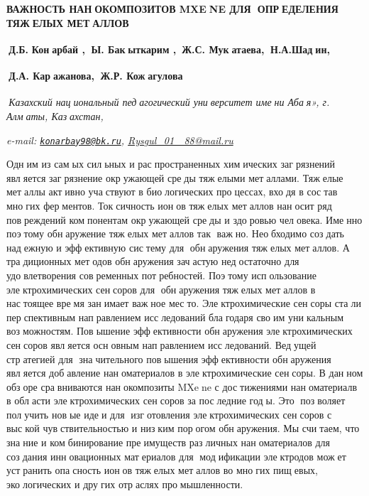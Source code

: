 {{\bfseries ВАЖНОСТЬ НАНОКОМПОЗИТОВ MXENE ДЛЯ ОПРЕДЕЛЕНИЯ ТЯЖЕЛЫХ
МЕТАЛЛОВ}

{\bfseries \textsuperscript{}Д.Б.}
{\bfseries Кон}{\bfseries арбай\textsuperscript{\envelope } , \textsuperscript{}Ы.
Бакыткарим\textsuperscript{\envelope } ,} \textsuperscript{}{\bfseries Ж.С.
Мукатаева, \textsuperscript{}Н.А.Шадин,}

{\bfseries \textsuperscript{}Д.А. Каражанова, \textsuperscript{}Ж.Р.
Кожагулова}

\emph{\textsuperscript{}Казахский национальный педагогический
университет имени Абая», г. Алматы, Казахстан,}

\emph{e-mail:
\href{mailto:konarbay98@bk.ru}{\nolinkurl{konarbay98@bk.ru}},
\href{mailto:Rysgul_01_88@mail.ru}{Rysgul\_01\_88@mail.ru}}

Одним из самых сильных и распространенных химических загрязнений
является загрязнение окружающей среды тяжелыми металлами. Тяжелые
металлы активно участвуют в биологических процессах, входя в
состав многих ферментов. Токсичность ионов тяжелых металлов
наносит ряд повреждений компонентам окружающей среды и здоровью
человека. Именно поэтому обнаружение тяжелых металлов так важно.
Необходимо создать надежную и эффективную систему для обнаружения
тяжелых металлов. А традиционных методов обнаружения зачастую
недостаточно для удовлетворения современных потребностей. Поэтому
использование электрохимических сенсоров для обнаружения тяжелых
металлов в настоящее время занимает важное место.
Электрохимические сенсоры стали перспективным направлением
исследований благодаря своим уникальным возможностям. Повышение
эффективности обнаружения электрохимических сенсоров является
основным направлением исследований. Ведущей стратегией для
значительного повышения эффективности обнаружения является
добавление наноматериалов в электрохимические сенсоры. В данном
обзоре сравниваются нанокомпозиты MXene с достижениями
наноматериалв в области электрохимических сенсоров за последние
годы. Это позволяет получить новые идеи для изготовления
электрохимических сенсоров с выской чувствительностью и низким
порогом обнаружения. Мы считаем, что знание и комбинирование
преимуществ различных наноматериалов для создания инновационных
материалов для модификации электродов может устранить опасность
ионов тяжелых металлов во многих пищевых, экологических и других
отраслях промышленности.

}
